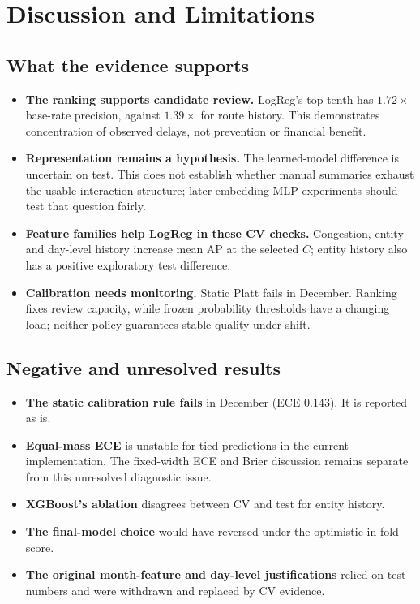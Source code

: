 \documentclass[conference]{IEEEtran}
\begin{document}
\section{Discussion and Limitations}\label{sec:discussion}
\subsection{What the evidence supports}
\begin{itemize}
\item \textbf{The ranking supports candidate review.} LogReg's top tenth has $1.72\times$ base-rate precision, against $1.39\times$ for route history. This demonstrates concentration of observed delays, not prevention or financial benefit.
\item \textbf{Representation remains a hypothesis.} The learned-model difference is uncertain on test. This does not establish whether manual summaries exhaust the usable interaction structure; later embedding MLP experiments should test that question fairly.
\item \textbf{Feature families help LogReg in these CV checks.} Congestion, entity and day-level history increase mean AP at the selected $C$; entity history also has a positive exploratory test difference.
\item \textbf{Calibration needs monitoring.} Static Platt fails in December. Ranking fixes review capacity, while frozen probability thresholds have a changing load; neither policy guarantees stable quality under shift.
\end{itemize}

\subsection{Negative and unresolved results}
\begin{itemize}
\item \textbf{The static calibration rule fails} in December (ECE 0.143). It is reported as is.
\item \textbf{Equal-mass ECE} is unstable for tied predictions in the current implementation. The fixed-width ECE and Brier discussion remains separate from this unresolved diagnostic issue.
\item \textbf{XGBoost's ablation} disagrees between CV and test for entity history.
\item \textbf{The final-model choice} would have reversed under the optimistic in-fold score.
\item \textbf{The original month-feature and day-level justifications} relied on test numbers and were withdrawn and replaced by CV evidence.
\end{itemize}
\end{document}

